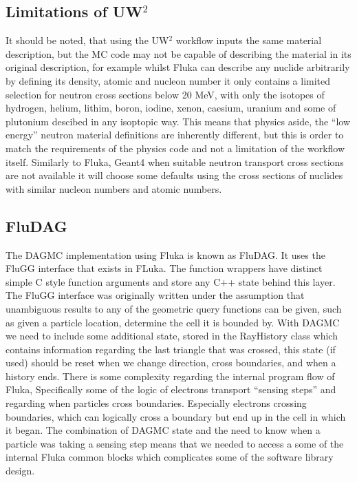 \subsection{Limitations of UW$^2$}
It should be noted, that using the UW$^2$ workflow inputs the same material description, but the MC 
code may not be capable of describing the material in its original description, for example whilst
Fluka can describe any nuclide arbitrarily by defining its density, atomic and nucleon number it only
contains a limited selection for neutron cross sections below 20 MeV, with only the isotopes of 
hydrogen, helium, lithim, boron, iodine, xenon, caesium, uranium and some of plutonium descibed in
any isoptopic way. This means that physics aside, the ``low energy'' neutron material definitions are
inherently different, but this is order to match the requirements of the physics code and not a limitation 
of the workflow itself. Similarly to Fluka, Geant4 when suitable neutron transport cross sections are not 
available it will choose some defaults using the cross sections of nuclides with similar nucleon numbers
and atomic numbers.

\subsection{FluDAG}
The DAGMC implementation using Fluka is known as FluDAG. It uses the FluGG interface that exists
in FLuka. The function wrappers have distinct simple C style function arguments and store any 
C++ state behind this layer. The FluGG interface was originally written under the assumption
that unambiguous results to any of the geometric query functions can be given, such as 
given a particle location, determine the cell it is bounded by. With DAGMC we need to include some
additional state, stored in the RayHistory class which contains information regarding the last triangle
that was crossed, this state (if used) should be reset when we change direction, cross boundaries, and
when a history ends. There is some complexity regarding the internal program flow of Fluka, Specifically
some of the logic of electrons transport ``sensing steps'' and regarding when particles cross boundaries. 
Especially electrons crossing boundaries, which can logically cross a boundary but end up in the cell in 
which it began. The combination of DAGMC state and the need to know when a particle was taking a sensing step 
means that we needed to access a some of the internal Fluka common blocks which complicates some of the
software library design.

